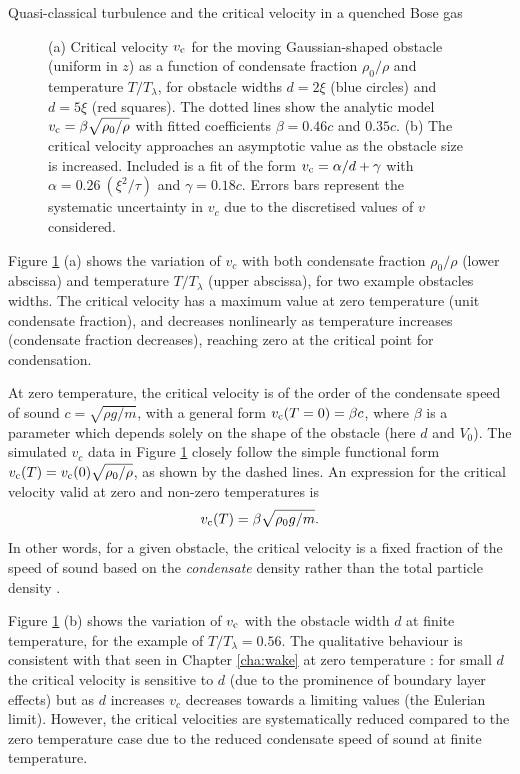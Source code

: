 \begin{chapter}{\label{cha:nonequib}Quasi-classical turbulence and the critical velocity in a quenched Bose gas}
\begin{figure}
\begin{center}
\end{center}
  \caption{\label{fig:vc-n0}(a) Critical velocity $v_{\rm c}$ for the moving Gaussian-shaped obstacle (uniform in $z$) as a function of condensate fraction $\rho_0/\rho$ and temperature $T/T_\lambda$, for obstacle widths $d=2\xi$ (blue circles) and $d=5\xi$ (red squares). The dotted lines show the analytic model $v_{\rm c}=\beta \sqrt{\rho_0/\rho}$ with fitted coefficients $\beta=0.46c$ and $0.35c$. (b) The critical velocity approaches an asymptotic value as the obstacle size is increased. Included is a fit of the form $v_{\rm c}=\alpha/d+\gamma$ with $\alpha=0.26~(\xi^2/\tau)$ and $\gamma=0.18 c$.  Errors bars represent the systematic uncertainty in $v_c$ due to the discretised values of $v$ considered.}
\end{figure}

Figure \ref{fig:vc-n0} (a) shows the variation of $v_c$ with both condensate fraction $\rho_0/\rho$ (lower abscissa) and temperature $T/T_\lambda$ (upper abscissa), for two example obstacles widths.  The critical velocity has a maximum value at zero temperature (unit condensate fraction), and decreases nonlinearly as temperature increases (condensate fraction decreases), reaching zero at the critical point for condensation.

At zero temperature, the critical velocity is of the order of the condensate speed of sound $c=\sqrt{\rho g/m}$, with a general form $v_{\rm c}(T=0)=\beta c$,
where $\beta$ is a parameter which depends solely on the shape of the
obstacle (here $d$ and $V_0$).  The simulated $v_c$ data in
Figure \ref{fig:vc-n0} closely follow the simple functional form
$v_{\rm c}(T) = v_{\rm c}(0) \sqrt{\rho_0/\rho}$, as shown by the dashed lines.
An expression for the critical velocity valid at zero and non-zero
temperatures is
\begin{equation}
v_{\rm c}(T)=\beta \sqrt{\rho_0 g/m}.
\label{eqn:finite_vc}
\end{equation}
In other words, for a given obstacle, the critical velocity is a fixed
fraction of the speed of sound based on the {\it condensate} density
rather than the total particle density \cite{leadbeater_2003}.

Figure \ref{fig:vc-n0} (b) shows the variation of $v_{\rm c}$ with the obstacle width $d$ at finite temperature, for the example of $T/T_\lambda =0.56$.   The qualitative behaviour is consistent with that seen in Chapter \ref{cha:wake} at zero temperature \cite{huepe00,rica2001,stagg_parker_14}: for small $d$ the critical velocity is sensitive to $d$ (due to the prominence of boundary layer effects) but as $d$ increases $v_c$ decreases towards a limiting values (the Eulerian limit).  However, the critical velocities are systematically reduced compared to the zero temperature case due to the reduced condensate speed of sound at finite temperature.



\end{chapter}
